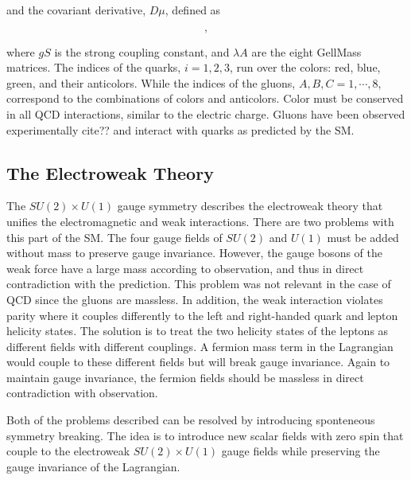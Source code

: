 and the covariant derivative, $D\mu$,  defined as

\begin{equation}
,
\end{equation}

where $gS$ is the strong coupling constant, and $\lambda A$ are the eight GellMass matrices.
The indices of the quarks, $i=1,2,3$, run over the colors: red, blue, green, and their anticolors.
While the indices of the gluons, $A,B,C = 1, \cdots, 8$, correspond to the combinations of colors and anticolors.
Color must be conserved in all QCD interactions, similar to the  electric charge.
Gluons have been observed experimentally cite?? and interact with quarks as predicted by the SM.

\subsection{The Electroweak Theory}

The $ SU\left(2\right) \times U\left(1\right) $ gauge symmetry describes the
electroweak theory that unifies the electromagnetic and weak interactions.
There are two problems with this part of the SM.
The four gauge fields of $ SU\left(2\right) $ and $ U\left(1\right) $ 
must be added without mass to preserve gauge invariance.
However, the gauge bosons of the weak force have a large mass according to observation,
and thus in direct contradiction with the prediction.
This problem was not relevant in the case of QCD since the gluons are massless. 
In addition, the weak interaction violates parity where it couples differently 
to the left and right-handed quark and lepton helicity states.
The solution is to treat the two helicity states of the leptons as different fields
with different couplings. A fermion mass term in the Lagrangian would couple to 
these different fields but will break gauge invariance.
Again to maintain gauge invariance, the fermion fields should be massless in 
direct contradiction with observation.

Both of the problems described can be resolved by introducing 
sponteneous symmetry breaking. The idea is to introduce new scalar fields with 
zero spin that couple to the electroweak  $ SU\left(2\right) \times U\left(1\right) $
gauge fields while preserving the gauge invariance of the Lagrangian.


 







